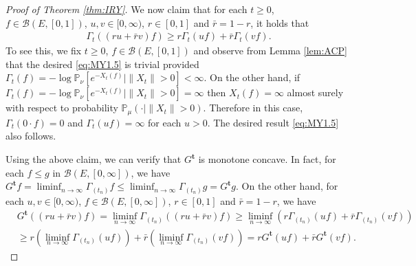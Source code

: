 \documentclass[12pt,a4paper]{amsart}
\numberwithin{equation}{section}
\theoremstyle{plain}
\theoremstyle{definition}
\begin{document}
\begin{proof}[Proof of Theorem \ref{thm:IRY}]
We now claim that for each $t\geq 0$, $f\in \mathcal B(E,[0,1])$, $u,v \in [0,\infty)$, $r\in [0,1]$ and $\bar r = 1 - r$, it holds that
\begin{align}
  \label{eq:MY1.5}
\Gamma_t((ru+\bar r v)f) 
 \geq r \Gamma_t (uf) + \bar r \Gamma_t (vf).
\end{align}
To see this, we fix $t\geq 0$, $f\in \mathcal B(E,[0,1])$ and observe from Lemma \ref{lem:ACP} that the desired \eqref{eq:MY1.5} is trivial provided $\Gamma_t(f) = - \log \mathbb P_\nu[e^{-X_t(f)}|\|X_t\|>0]< \infty$. 
On the other hand, if $\Gamma_t(f) = - \log \mathbb P_\nu[e^{-X_t(f)}|\|X_t\|>0] = \infty$ then $X_t(f) = \infty$ almost surely with respect to probability $\mathbb P_\mu(\cdot | \|X_t\|>0)$. 
Therefore in this case, $\Gamma_t(0\cdot f) = 0$ and $\Gamma_t(uf) = \infty$ for each $u > 0$. 
The desired result \eqref{eq:MY1.5} also follows.

Using the above claim, we can verify that $G^\mathbf t$ is monotone concave.
In fact, for each $f \leq g$ in $\mathcal B(E,[0,\infty])$, we have
\(	
G^{\mathbf t} f = \liminf_{n\to \infty} \Gamma_{(t_n)} f
  \leq \liminf_{n\to \infty} \Gamma_{(t_n)} g
  = G^{\mathbf t} g.
  \)
On the other hand, for each $u,v \in [0,\infty)$, $f\in \mathcal B(E,[0,\infty])$, $r \in [0,1]$ and $\bar r = 1 - r$, we have
\begin{align}
	& G^{\mathbf t}((ru + \bar rv)f)
   = \liminf_{n \to \infty} \Gamma_{(t_n)}((ru + \bar rv)f)
   \geq \liminf_{n\to \infty} (r\Gamma_{(t_n)} (uf) + \bar r\Gamma_{(t_n)}(vf)) \\
  & \geq r (\liminf_{n\to \infty} \Gamma_{(t_n)} (uf)) + \bar r (\liminf_{n\to \infty} \Gamma_{(t_n)}(vf) ) 
    = r G^{\mathbf t} (uf) + \bar r G^{\mathbf t}(vf).
\end{align}


\end{proof}
\end{document}
